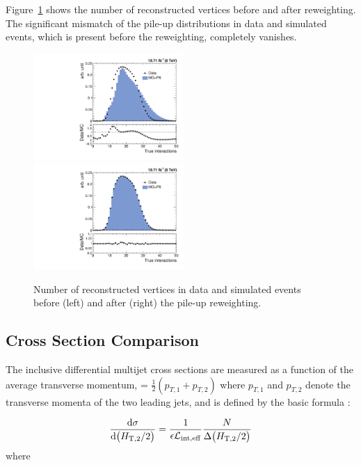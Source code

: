 Figure~\ref{fig:pileup} shows the number of reconstructed vertices before and after reweighting. The significant mismatch of the pile-up 
distributions in data and simulated events, which is present before the reweighting, completely vanishes.

\begin{figure}[!htbp]
  \begin{center}
    \includegraphics[width=0.51\textwidth]{Plots_HT_2_150/Nvertices.pdf}%
    ~~\includegraphics[width=0.51\textwidth]{Plots_HT_2_150/Nvertices_weight.pdf}
    \caption{Number of reconstructed vertices in data and simulated events before (left) and after (right) the pile-up reweighting.}
    \label{fig:pileup}
  \end{center}
\end{figure}

\subsection{Cross Section Comparison}
The inclusive differential multijet cross sections are measured as a
function of the average transverse momentum, \httwo =
$\frac{1}{2}(p_{T,1} + p_{T,2})$ where $p_{T,1}$ and $p_{T,2}$ denote
the transverse momenta of the two leading jets, and is defined 
by the basic formula : 

\begin{equation}
  \label{inclusive_formula}
        {\dd{\sigma}{\big(\httwo\big)}} = \frac{1}{\epsilon\lumi_{\mathrm{int,eff}}}\frac{N}{\Delta\big(\httwo\big)}
\end{equation}
where

